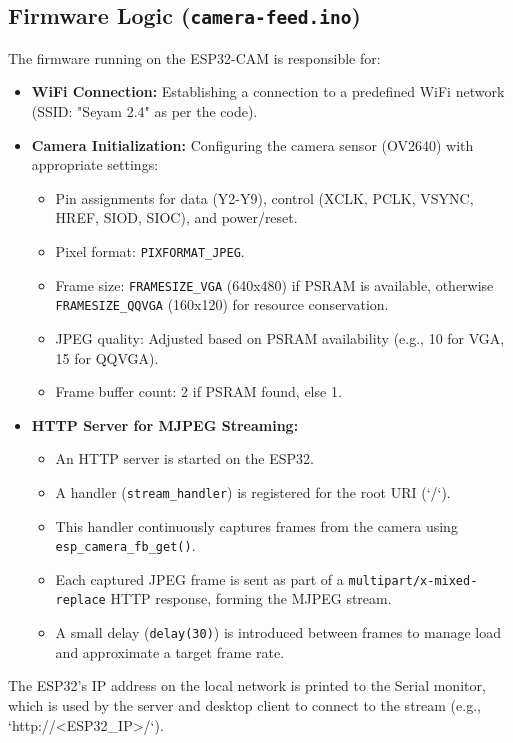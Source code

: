 \documentclass[12pt, a4paper]{report}
\begin{document}
\subsection{Firmware Logic (\texttt{camera-feed.ino})}
The firmware running on the ESP32-CAM is responsible for:
\begin{itemize}
    \item \textbf{WiFi Connection:} Establishing a connection to a predefined WiFi network (SSID: "Seyam 2.4" as per the code).
    \item \textbf{Camera Initialization:} Configuring the camera sensor (OV2640) with appropriate settings:
        \begin{itemize}
            \item Pin assignments for data (Y2-Y9), control (XCLK, PCLK, VSYNC, HREF, SIOD, SIOC), and power/reset.
            \item Pixel format: \texttt{PIXFORMAT\_JPEG}.
            \item Frame size: \texttt{FRAMESIZE\_VGA} (640x480) if PSRAM is available, otherwise \texttt{FRAMESIZE\_QQVGA} (160x120) for resource conservation.
            \item JPEG quality: Adjusted based on PSRAM availability (e.g., 10 for VGA, 15 for QQVGA).
            \item Frame buffer count: 2 if PSRAM found, else 1.
        \end{itemize}
    \item \textbf{HTTP Server for MJPEG Streaming:}
        \begin{itemize}
            \item An HTTP server is started on the ESP32.
            \item A handler (\texttt{stream\_handler}) is registered for the root URI (`/`).
            \item This handler continuously captures frames from the camera using \texttt{esp\_camera\_fb\_get()}.
            \item Each captured JPEG frame is sent as part of a \texttt{multipart/x-mixed-replace} HTTP response, forming the MJPEG stream.
            \item A small delay (\texttt{delay(30)}) is introduced between frames to manage load and approximate a target frame rate.
        \end{itemize}
\end{itemize}
The ESP32's IP address on the local network is printed to the Serial monitor, which is used by the server and desktop client to connect to the stream (e.g., `http://<ESP32\_IP>/`).
\end{document}
